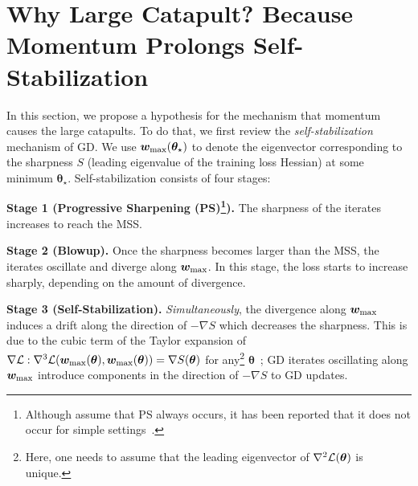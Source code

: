 \section{Why Large Catapult? Because Momentum Prolongs Self-Stabilization}
\label{sec:prolong}
In this section, we propose a hypothesis for the mechanism that momentum causes the large catapults.
To do that, we first review the \emph{self-stabilization}~\citep{damian2023stabilization} mechanism of GD. 
We use ${\bm{w}}_{\max}(\bm\theta_\star)$ to denote the eigenvector corresponding to the sharpness $S$ (leading eigenvalue of the training loss Hessian) at some minimum $\bm\theta_\star$.
Self-stabilization consists of four stages: 

\textbf{Stage 1 (Progressive Sharpening (PS)\footnote{Although \citet{damian2023stabilization} assume that PS always occurs, it has been reported that it does not occur for simple settings~\citep{cohen2021stability,zhu2023catapult}.}).} The sharpness of the iterates increases to reach the MSS.

\textbf{Stage 2 (Blowup).} Once the sharpness becomes larger than the MSS, the iterates oscillate and diverge along ${\bm{w}}_{\max}$.
In this stage, the loss starts to increase sharply, depending on the amount of divergence.

\textbf{Stage 3 (Self-Stabilization).} {\it Simultaneously}, the divergence along ${\bm{w}}_{\max}$ induces a drift along the direction of $-\nabla S$ which decreases the sharpness. This is due to the cubic term of the Taylor expansion of
$\nabla {\mathcal{L}}: \nabla^3 {\mathcal{L}}({\bm{w}}_{\max}(\bm\theta), 
{\bm{w}}_{\max}(\bm\theta)) = \nabla S(\bm\theta)$ for any\footnote{Here, one needs to assume that the leading eigenvector of $\nabla^2 {\mathcal{L}}(\bm\theta)$ is unique.} $\bm\theta$~\citep[Lemma 2]{damian2023stabilization}; GD iterates oscillating along ${\bm{w}}_{\max}$ introduce components in the direction of $-\nabla S$ to GD updates.


